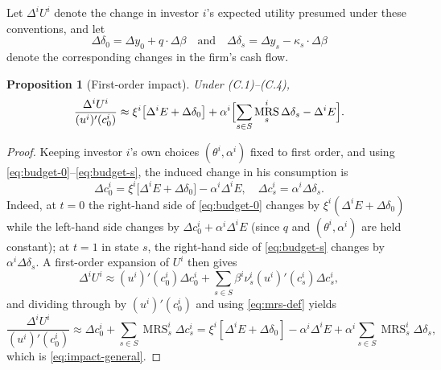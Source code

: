 \documentclass[11pt,a4paper,oneside]{book}
\def\et{\quad \text{and} \quad}
\DeclareMathOperator{\MRS}{MRS}
\theoremstyle{plain}
\newtheorem{proposition}[theorem]{Proposition}
\theoremstyle{definition}
\theoremstyle{remark}
\numberwithin{equation}{chapter}
\begin{document}
Let $\Delta^i U^i$ denote the change in investor $i$'s expected utility presumed under these conventions, and let
\begin{equation*}
  \Delta \delta_0 = \Delta y_0 + q \cdot \Delta \beta
  \et
  \Delta \delta_s = \Delta y_s - \kappa_s \cdot \Delta \beta
\end{equation*}
denote the corresponding changes in the firm's cash flow.

\begin{proposition}[First-order impact]\label{prop:impact}
Under \textup{(C.1)--(C.4)},
\begin{equation}\label{eq:impact-general}
  \frac{\Delta^i U^i}{(u^i)'(c^i_0)}
  \approx
  \xi^i \bigl[ \Delta^i E + \Delta \delta_0 \bigr]
  + \alpha^i \Bigl[ \sum_{s \in S} \MRS^i_s \Delta \delta_s - \Delta^i E \Bigr].
\end{equation}
\end{proposition}

\begin{proof}
Keeping investor $i$'s own choices $(\theta^i, \alpha^i)$ fixed to first order, and using \eqref{eq:budget-0}--\eqref{eq:budget-s}, the induced change in his consumption is
\begin{equation*}
  \Delta c^i_0 = \xi^i \bigl[ \Delta^i E + \Delta \delta_0 \bigr] - \alpha^i \Delta^i E,
  \quad
  \Delta c^i_s = \alpha^i \Delta \delta_s.
\end{equation*}
Indeed, at $t=0$ the right-hand side of \eqref{eq:budget-0} changes by $\xi^i (\Delta^i E + \Delta \delta_0)$ while the left-hand side changes by $\Delta c^i_0 + \alpha^i \Delta^i E$ (since $q$ and $(\theta^i, \alpha^i)$ are held constant); at $t=1$ in state $s$, the right-hand side of \eqref{eq:budget-s} changes by $\alpha^i \Delta \delta_s$.
A first-order expansion of $U^i$ then gives
\begin{equation*}
  \Delta^i U^i \approx (u^i)'(c^i_0) \Delta c^i_0
  + \sum_{s \in S} \beta^i \nu^i_s (u^i)'(c^i_s) \Delta c^i_s,
\end{equation*}
and dividing through by $(u^i)'(c^i_0)$ and using \eqref{eq:mrs-def} yields
\begin{equation*}
  \frac{\Delta^i U^i}{(u^i)'(c^i_0)}
  \approx \Delta c^i_0 + \sum_{s \in S} \MRS^i_s \Delta c^i_s
  = \xi^i [\Delta^i E + \Delta \delta_0] - \alpha^i \Delta^i E + \alpha^i \sum_{s \in S} \MRS^i_s \Delta \delta_s,
\end{equation*}
which is \eqref{eq:impact-general}.
\end{proof}
\end{document}
